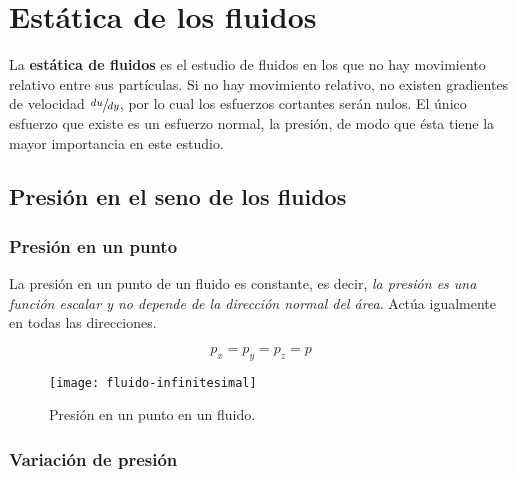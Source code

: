\section{Estática de los fluidos}

La \textbf{estática de fluidos} es el estudio de fluidos en los que no hay movimiento relativo entre sus partículas. Si no hay movimiento relativo, no existen gradientes de velocidad $\sfrac{du}{dy}$, por lo cual los esfuerzos cortantes serán nulos. El único esfuerzo que existe es un esfuerzo normal, la presión, de modo que ésta tiene la mayor importancia en este estudio.


\subsection{Presión en el seno de los fluidos}%

\subsubsection{Presión en un punto}

La presión en un punto de un fluido es constante, es decir, \textsl{la presión es una función escalar y no depende de la dirección normal del área}. Actúa igualmente en todas las direcciones.

\begin{equation}
	p_x = p_y = p_z = p
\end{equation}

\begin{figure}[H]
	\centering
	\texttt{[image: fluido-infinitesimal]}
	\caption{Presión en un punto en un fluido.}
	\label{fig:elemento-infinitesimal}
\end{figure}

\subsubsection{Variación de presión}

